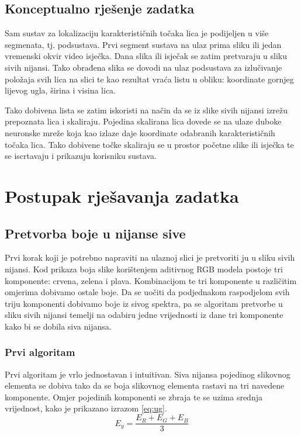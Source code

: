 \documentclass[times, utf8, zavrsni, numeric]{fer}
\begin{document}
\section{Konceptualno rješenje zadatka}

Sam sustav za lokalizaciju karakterističnih točaka lica je podijeljen u više segmenata, tj. podsustava. Prvi segment sustava na ulaz prima sliku ili jedan vremenski okvir video isječka. Dana slika ili isječak se zatim pretvaraju u sliku sivih nijansi. Tako obrađena slika se dovodi na ulaz podsustava za izlučivanje položaja svih lica na slici te kao rezultat vraća listu u obliku: koordinate gornjeg lijevog ugla, širina i visina lica.

Tako dobivena lista se zatim iskoristi na način da se iz slike sivih nijansi izrežu prepoznata lica i skaliraju. Pojedina skalirana lica dovede se na ulaze duboke neuronske mreže koja kao izlaze daje koordinate odabranih karakterističnih točaka lica. Tako dobivene točke skaliraju se u prostor početne slike ili isječka te se iscrtavaju i prikazuju korisniku sustava.

\chapter{Postupak rješavanja zadatka}

\section{Pretvorba boje u nijanse sive}

Prvi korak koji je potrebno napraviti na ulaznoj slici je pretvoriti ju u sliku sivih nijansi. Kod prikaza boja slike korištenjem aditivnog RGB  modela postoje tri komponente: crvena, zelena i plava. Kombinacijom te tri komponente u različitim omjerima dobivamo ostale boje. Da se uočiti da podjednakom raspodjelom svih triju komponenti dobivamo boje iz sivog spektra, pa se algoritam pretvorbe u sliku sivih nijansi temelji na odabiru jedne vrijednosti iz dane tri komponente kako bi se dobila siva nijansa.

\subsection{Prvi algoritam}

Prvi algoritam je vrlo jednostavan i intuitivan. Siva nijansa pojedinog slikovnog elementa se dobiva tako da se boja slikovnog elementa rastavi na tri navedene komponente. Omjer pojedinih komponenti se zbraja te se uzima srednja vrijednost, kako je prikazano izrazom \eqref{eq:ug}.
\begin{equation}\label{eq:ug}
E_y = \frac{E_R + E_G + E_B}{3}
\end{equation} 
\end{document}
